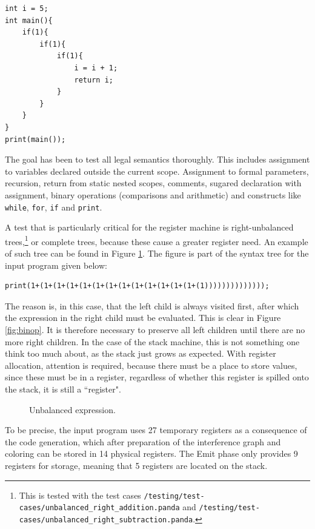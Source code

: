 \begin{verbatim}
int i = 5;
int main(){
    if(1){
        if(1){
            if(1){
                i = i + 1;
                return i;
            }
        }
    }
}
print(main());
\end{verbatim}

The goal has been to test all legal semantics thoroughly. This includes assignment to variables declared outside the current scope. Assignment to formal parameters, recursion, return from static nested scopes, comments, sugared declaration with assignment, binary operations (comparisons and arithmetic) and constructs like \texttt{while}, \texttt{for}, \texttt{if} and \texttt{print}.

A test that is particularly critical for the register machine is right-unbalanced trees,\footnote{This is tested with the test cases \texttt{/testing/test-cases/unbalanced\_right\_addition.panda} and \texttt{/testing/test-cases/unbalanced\_right\_subtraction.panda}.} or complete trees, because these cause a greater register need. An example of such tree can be found in Figure \ref{fig:unbalanced_tree}. The figure is part of the syntax tree for the input program given below:

\begin{verbatim}
print(1+(1+(1+(1+(1+(1+(1+(1+(1+(1+(1+(1+(1+(1))))))))))))));
\end{verbatim}

The reason is, in this case, that the left child is always visited first, after which the expression in the right child must be evaluated. This is clear in Figure \ref{fig:binop}. It is therefore necessary to preserve all left children until there are no more right children. In the case of the stack machine, this is not something one think too much about, as the stack just grows as expected. With register allocation, attention is required, because there must be a place to store values, since these must be in a register, regardless of whether this register is spilled onto the stack, it is still a ``register".

\begin{figure}[H]
    \centering
    
    \caption{Unbalanced expression.} 
    \label{fig:unbalanced_tree}
\end{figure}

To be precise, the input program uses 27 temporary registers as a consequence of the code generation, which after preparation of the interference graph and coloring can be stored in 14 physical registers. The Emit phase only provides 9 registers for storage, meaning that 5 registers are located on the stack.


